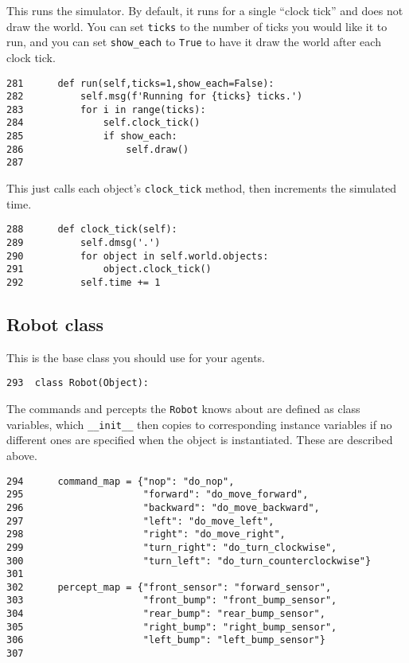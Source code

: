 \documentclass[11pt]{tufte-handout}
\begin{document}
This runs the simulator.  By default, it runs for a single ``clock tick'' and does not draw the world.  You can set \texttt{ticks} to the number of ticks you would like it to run, and you can set \texttt{show\_each} to \texttt{True} to have it draw the world after each clock tick.

\begin{verbatim}
281      def run(self,ticks=1,show_each=False):
282          self.msg(f'Running for {ticks} ticks.')
283          for i in range(ticks):
284              self.clock_tick()
285              if show_each:
286                  self.draw()
287  
\end{verbatim}

This just calls each object's \texttt{clock\_tick} method, then increments the simulated time.

\begin{verbatim}
288      def clock_tick(self):
289          self.dmsg('.')
290          for object in self.world.objects:
291              object.clock_tick()
292          self.time += 1
\end{verbatim}


\subsection{Robot class}
\label{sec:orgeddcd03}

This is the base class you should use for your agents.

\begin{verbatim}
293  class Robot(Object):
\end{verbatim}

The commands and percepts the \texttt{Robot} knows about are defined as class variables, which \texttt{\_\_init\_\_} then copies to corresponding instance variables if no different ones are specified when the object is instantiated.  These are described above.

\begin{verbatim}
294      command_map = {"nop": "do_nop",
295                     "forward": "do_move_forward",
296                     "backward": "do_move_backward", 
297                     "left": "do_move_left", 
298                     "right": "do_move_right", 
299                     "turn_right": "do_turn_clockwise",
300                     "turn_left": "do_turn_counterclockwise"}
301  
302      percept_map = {"front_sensor": "forward_sensor", 
303                     "front_bump": "front_bump_sensor", 
304                     "rear_bump": "rear_bump_sensor", 
305                     "right_bump": "right_bump_sensor", 
306                     "left_bump": "left_bump_sensor"}
307  
\end{verbatim}
\end{document}
